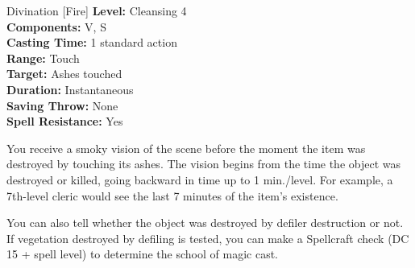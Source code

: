 {Divination [Fire]}
{
	\textbf{Level:}
	Cleansing 4\\
	\textbf{Components:}
	V, S\\
	\textbf{Casting Time:}
	1 standard action\\
	\textbf{Range:}
	Touch\\
	\textbf{Target:}
	Ashes touched\\
	\textbf{Duration:}
	Instantaneous\\
	\textbf{Saving Throw:}
	None\\
	\textbf{Spell Resistance:}
	Yes\\
}
{
	You receive a smoky vision of the scene before the moment the item was destroyed by touching its ashes. The vision begins from the time the object was destroyed or killed, going backward in time up to 1 min./level. For example, a 7th-level cleric would see the last 7 minutes of the item's existence.

	You can also tell whether the object was destroyed by defiler destruction or not. If vegetation destroyed by defiling is tested, you can make a Spellcraft check (DC 15 + spell level) to determine the school of magic cast.
}